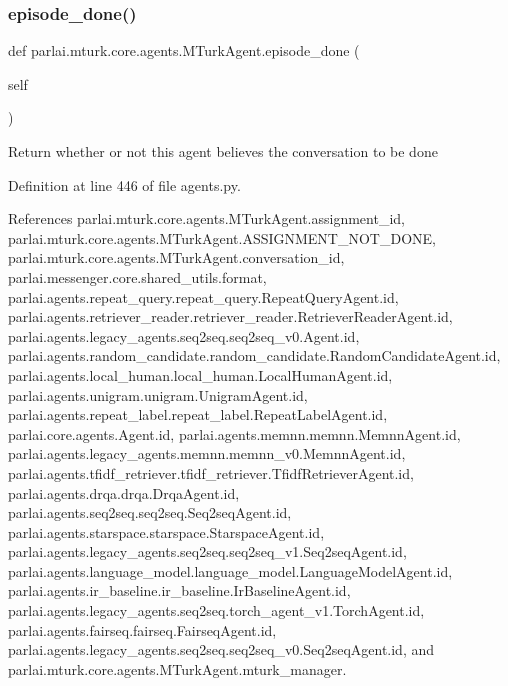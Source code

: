 \mbox{\label{classparlai_1_1mturk_1_1core_1_1agents_1_1MTurkAgent_a9ab8c622bfe7d697d7cba94dc7c4b5a3}} 
\subsubsection{\texorpdfstring{episode\+\_\+done()}{episode\_done()}}
{\footnotesize\ttfamily def parlai.\+mturk.\+core.\+agents.\+M\+Turk\+Agent.\+episode\+\_\+done (\begin{DoxyParamCaption}\item[{}]{self }\end{DoxyParamCaption})}

\begin{DoxyVerb}Return whether or not this agent believes the conversation to
be done\end{DoxyVerb}
 

Definition at line 446 of file agents.\+py.



References parlai.\+mturk.\+core.\+agents.\+M\+Turk\+Agent.\+assignment\+\_\+id, parlai.\+mturk.\+core.\+agents.\+M\+Turk\+Agent.\+A\+S\+S\+I\+G\+N\+M\+E\+N\+T\+\_\+\+N\+O\+T\+\_\+\+D\+O\+NE, parlai.\+mturk.\+core.\+agents.\+M\+Turk\+Agent.\+conversation\+\_\+id, parlai.\+messenger.\+core.\+shared\+\_\+utils.\+format, parlai.\+agents.\+repeat\+\_\+query.\+repeat\+\_\+query.\+Repeat\+Query\+Agent.\+id, parlai.\+agents.\+retriever\+\_\+reader.\+retriever\+\_\+reader.\+Retriever\+Reader\+Agent.\+id, parlai.\+agents.\+legacy\+\_\+agents.\+seq2seq.\+seq2seq\+\_\+v0.\+Agent.\+id, parlai.\+agents.\+random\+\_\+candidate.\+random\+\_\+candidate.\+Random\+Candidate\+Agent.\+id, parlai.\+agents.\+local\+\_\+human.\+local\+\_\+human.\+Local\+Human\+Agent.\+id, parlai.\+agents.\+unigram.\+unigram.\+Unigram\+Agent.\+id, parlai.\+agents.\+repeat\+\_\+label.\+repeat\+\_\+label.\+Repeat\+Label\+Agent.\+id, parlai.\+core.\+agents.\+Agent.\+id, parlai.\+agents.\+memnn.\+memnn.\+Memnn\+Agent.\+id, parlai.\+agents.\+legacy\+\_\+agents.\+memnn.\+memnn\+\_\+v0.\+Memnn\+Agent.\+id, parlai.\+agents.\+tfidf\+\_\+retriever.\+tfidf\+\_\+retriever.\+Tfidf\+Retriever\+Agent.\+id, parlai.\+agents.\+drqa.\+drqa.\+Drqa\+Agent.\+id, parlai.\+agents.\+seq2seq.\+seq2seq.\+Seq2seq\+Agent.\+id, parlai.\+agents.\+starspace.\+starspace.\+Starspace\+Agent.\+id, parlai.\+agents.\+legacy\+\_\+agents.\+seq2seq.\+seq2seq\+\_\+v1.\+Seq2seq\+Agent.\+id, parlai.\+agents.\+language\+\_\+model.\+language\+\_\+model.\+Language\+Model\+Agent.\+id, parlai.\+agents.\+ir\+\_\+baseline.\+ir\+\_\+baseline.\+Ir\+Baseline\+Agent.\+id, parlai.\+agents.\+legacy\+\_\+agents.\+seq2seq.\+torch\+\_\+agent\+\_\+v1.\+Torch\+Agent.\+id, parlai.\+agents.\+fairseq.\+fairseq.\+Fairseq\+Agent.\+id, parlai.\+agents.\+legacy\+\_\+agents.\+seq2seq.\+seq2seq\+\_\+v0.\+Seq2seq\+Agent.\+id, and parlai.\+mturk.\+core.\+agents.\+M\+Turk\+Agent.\+mturk\+\_\+manager.

